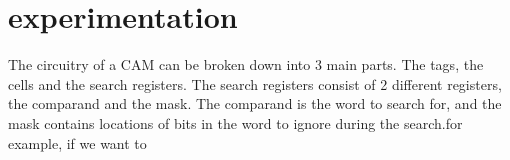 \section{experimentation}
The circuitry of a CAM can be broken down into 3 main parts. The tags, the cells and the search registers. 
The search registers consist of 2 different registers, the comparand and the mask. 
The comparand is the word to search for, and the mask contains locations of bits in the word to ignore during the search.for example, if we want to 